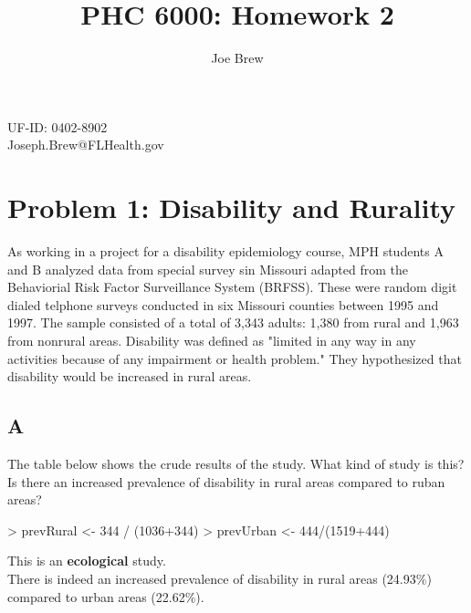 \documentclass[12pt]{article}
\title{PHC 6000: Homework 2}
\author{Joe Brew}
\begin{document}

\maketitle
\begin{center}
UF-ID: 0402-8902\\
\noindent Joseph.Brew@FLHealth.gov
\end{center}

\vspace{30mm}
\tableofcontents

\newpage
\section*{Problem 1: Disability and Rurality}
\textcolor{black!50}{As working in a project for a disability epidemiology course, MPH students A and B analyzed data from special survey sin Missouri adapted from the Behaviorial Risk Factor Surveillance System (BRFSS).  These were random digit dialed telphone surveys conducted in six Missouri counties between 1995 and 1997.  The sample consisted of a total of 3,343 adults: 1,380 from rural and 1,963 from nonrural areas.  Disability was defined as "limited in any way in any activities because of any impairment or health problem."  They hypothesized that disability would be increased in rural areas.} 

\subsection*{A}

\textcolor{black!50}{The table below shows the crude results of the study.  What kind of study is this?  Is there an increased prevalence of disability in rural areas compared to ruban areas? \\}

\begin{Schunk}
\begin{Sinput}
> prevRural <- 344 / (1036+344)
> prevUrban <- 444/(1519+444)
\end{Sinput}
\end{Schunk}


\noindent This is an \textbf{ecological} study.\\
There is indeed an increased prevalence of disability in rural areas (24.93\%) compared to urban areas (22.62\%).
\end{document}
